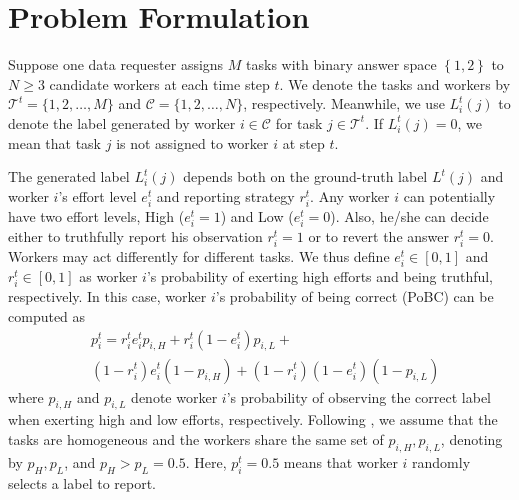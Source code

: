 \section{Problem Formulation}
\label{PF}
Suppose one data requester assigns $M$ tasks with binary answer space $\left\{1,2\right\}$ to $N \geq 3$ candidate workers at each time step $t$.
We denote the tasks and workers by $\mathcal{T}^{t}=\{1,2,\ldots,M\}$ and $\mathcal{C}=\{1,2,\ldots,N\}$, respectively.
Meanwhile, we use $L^{t}_{i}(j)$ to denote the label generated by worker $i\in \mathcal{C}$ for task $j\in\mathcal{T}^{t}$.
If $L^{t}_{i}(j)=0$, we mean that task $j$ is not assigned to worker $i$ at step $t$.

The generated label $L^{t}_{i}(j)$ depends both on the ground-truth label $L^{t}(j)$ and worker $i$'s effort level $e^{t}_i$ and reporting strategy $r^{t}_i$.
Any worker $i$ can potentially have two effort levels, High ($e^{t}_i=1$) and Low ($e^{t}_i=0$).
Also, he/she can decide either to truthfully report his observation $r^{t}_i = 1$ or to revert the answer $r^{t}_i = 0$.
Workers may act differently for different tasks. 
We thus define $e^{t}_i\in[0,1]$ and $r^{t}_i\in[0,1]$ as worker $i$'s probability of exerting high efforts and being truthful, respectively.
In this case, worker $i$'s probability of being correct (PoBC) can be computed as
\begin{equation}
\begin{split}
&p^{t}_i=r^{t}_i e^{t}_i p_{i, H}+r^{t}_i (1-e^{t}_i) p_{i, L}+\\
&(1-r^{t}_i) e^{t}_i (1-p_{i, H})+(1-r^{t}_i) (1-e^{t}_i) (1-p_{i, L})
\end{split}
\end{equation}
where $p_{i, H}$ and $p_{i, L}$ denote worker $i$'s probability of observing the correct label when exerting high and low efforts, respectively.
Following \cite{dasgupta2013crowdsourced,liu2017sequential}, we assume that the tasks are homogeneous and the workers share the same set of $p_{i, H}, p_{i, L}$, denoting by $p_H, p_L$, and $p_{H}>p_{L}= 0.5$.
Here, $p^t_i=0.5$ means that worker $i$ randomly selects a label to report.

